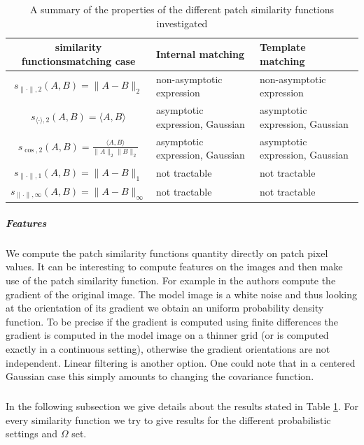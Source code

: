 \begin{table}[h]
  \begin{tabularx}{\textwidth}{|c||X|X|}
    \hline
    \diagbox{similarity \newline functions}{matching case}         & Internal matching               & Template matching               \\ \hline \hline
    $s_{\|\cdot\|,2}(A,B) = \| A-B \|_2$                           & non-asymptotic expression       & non-asymptotic expression       \\ \hline
    $s_{\langle \cdot\rangle,2}(A,B) = \langle A,B \rangle$        & asymptotic expression, Gaussian & asymptotic expression, Gaussian \\ \hline
    $s_{\cos,2}(A,B) = \frac{\langle A,B \rangle}{\|A\|_2\|B\|_2}$ & asymptotic expression, Gaussian & asymptotic expression, Gaussian \\ \hline
    $s_{\|\cdot\|, 1}(A,B) = \| A-B \|_1$                          & not tractable                   & not tractable                   \\ \hline
    $s_{\|\cdot\|,\infty}(A,B) = \| A-B \|_{\infty}$               & not tractable                   & not tractable                   \\ \hline    
  \end{tabularx}
  \caption{A summary of the properties of the different patch similarity functions investigated}
  \label{tab:patch_sim}
\end{table}
\subparagraph{Features} We compute the patch similarity functions quantity
directly on patch pixel values. It can be interesting to compute features on the
images and then make use of the patch similarity function.  For example in \cite{patraucean2013detection} the authors compute the gradient of the original image. The model image is a
white noise and thus looking at the orientation of its gradient we obtain an
uniform probability density function. To be precise if the gradient is computed
using finite differences the gradient is computed in the model image on a
thinner grid (or is computed exactly in a continuous setting), otherwise the
gradient orientations are not independent. Linear filtering is another
option. One could note that in a centered Gaussian case this simply amounts to
changing the covariance function.  \subparagraph{} In the following subsection
we give details about the results stated in Table \ref{tab:patch_sim}. For every similarity
function we try to give results for the different probabilistic settings and
$\Omega$ set.

